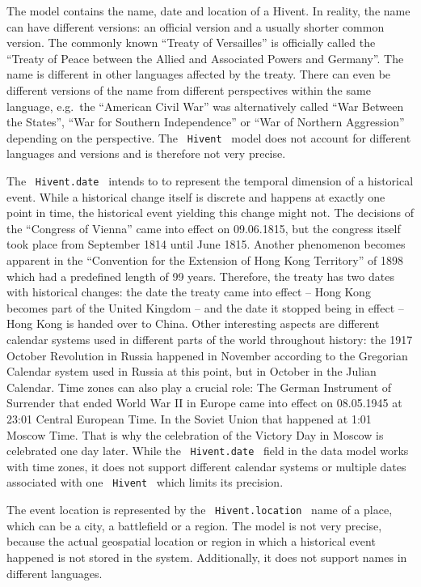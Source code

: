 The model contains the name, date and location of a Hivent. In reality, the name can have different versions: an official version and a usually shorter common version. The commonly known ``Treaty of Versailles'' is officially called the ``Treaty of Peace between the Allied and Associated Powers and Germany''. The name is different in other languages affected by the treaty. There can even be different versions of the name from different perspectives within the same language, e.g.\ the ``American Civil War'' was alternatively called ``War Between the States'', ``War for Southern Independence'' or ``War of Northern Aggression'' depending on the perspective.
The ~\texttt{Hivent}~ model does not account for different languages and versions and is therefore not very precise.

The ~\texttt{Hivent.date}~ intends to to represent the temporal dimension of a historical event. While a historical change itself is discrete and happens at exactly one point in time, the historical event yielding this change might not. The decisions of the ``Congress of Vienna'' came into effect on 09.06.1815, but the congress itself took place from September 1814 until June 1815. Another phenomenon becomes apparent in the ``Convention for the Extension of Hong Kong Territory'' of 1898 which had a predefined length of 99 years. Therefore, the treaty has two dates with historical changes: the date the treaty came into effect -- Hong Kong becomes part of the United Kingdom -- and the date it stopped being in effect -- Hong Kong is handed over to China. Other interesting aspects are different calendar systems used in different parts of the world throughout history: the 1917 October Revolution in Russia happened in November according to the Gregorian Calendar system used in Russia at this point, but in October in the Julian Calendar. Time zones can also play a crucial role: The German Instrument of Surrender that ended World War II in Europe came into effect on 08.05.1945 at 23:01 Central European Time. In the Soviet Union that happened at 1:01 Moscow Time. That is why the celebration of the Victory Day in Moscow is celebrated one day later. While the ~\texttt{Hivent.date}~ field in the data model works with time zones, it does not support different calendar systems or multiple dates associated with one ~\texttt{Hivent}~ which limits its precision.

The event location is represented by the ~\texttt{Hivent.location}~ name of a place, which can be a city, a battlefield or a region. The model is not very precise, because the actual geospatial location or region in which a historical event happened is not stored in the system. Additionally, it does not support names in different languages.

